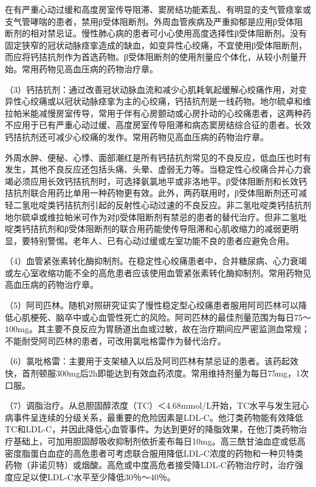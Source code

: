 在有严重心动过缓和高度房室传导阻滞、窦房结功能紊乱、有明显的支气管痉挛或支气管哮喘的患者，禁用β受体阻断剂。外周血管疾病及严重抑郁是应用β受体阻断剂的相对禁忌证。慢性肺心病的患者可小心使用高度选择性β受体阻断剂。没有固定狭窄的冠状动脉痉挛造成的缺血，如变异性心绞痛，不宜使用β受体阻断剂，而应将钙拮抗剂作为首选药物。β受体阻断剂的使用剂量应个体化，从较小剂量开始。常用药物见高血压病的药物治疗章。

（3）钙拮抗剂：通过改善冠状动脉血流和减少心肌耗氧起缓解心绞痛作用，对变异性心绞痛或以冠状动脉痉挛为主的心绞痛，钙拮抗剂是一线药物。地尔硫卓和维拉帕米能减慢房室传导，常用于伴有心房颤动或心房扑动的心绞痛患者，这两种药不应用于已有严重心动过缓、高度房室传导阻滞和病态窦房结综合征的患者。长效钙拮抗剂还可减少心绞痛的发作。常用药物见高血压病的药物治疗章。

外周水肿、便秘、心悸、面部潮红是所有钙拮抗剂常见的不良反应，低血压也时有发生，其他不良反应还包括头痛、头晕、虚弱无力等。当稳定性心绞痛合并心力衰竭必须应用长效钙拮抗剂时，可选择氨氯地平或非洛地平。β受体阻断剂和长效钙拮抗剂联合用药比单用一种药物更有效。此外，两药联用时，β受体阻断剂还可减轻二氢吡啶类钙拮抗剂引起的反射性心动过速的不良反应。非二氢吡啶类钙拮抗剂地尔硫卓或维拉帕米可作为对β受体阻断剂有禁忌的患者的替代治疗。但非二氢吡啶类钙拮抗剂和β受体阻断剂的联合用药能使传导阻滞和心肌收缩力的减弱更明显，要特别警惕。老年人、已有心动过缓或左室功能不良的患者应避免合用。

（4）血管紧张素转化酶抑制剂。在稳定性心绞痛患者中，合并糖尿病、心力衰竭或左心室收缩功能不全的高危患者应该使用血管紧张素转化酶抑制剂。常用药物见高血压病的药物治疗章。

（5）阿司匹林。随机对照研究证实了慢性稳定型心绞痛患者服用阿司匹林可以降低心肌梗死、脑卒中或心血管性死亡的风险。阿司匹林的最佳剂量范围为每日75～100mg。其主要不良反应为胃肠道出血或过敏，故在治疗期间应严密监测血常规；不能耐受阿司匹林的患者，可改用氯吡格雷作为替代治疗。

（6）氯吡格雷：主要用于支架植入以后及阿司匹林有禁忌证的患者。该药起效快，首剂顿服300mg后2h即能达到有效血药浓度。常用维持剂量为每日75mg，1次口服。

（7）调脂治疗。从总胆固醇浓度（TC）＜4.68mmol/L开始，TC水平与发生冠心病事件呈连续的分级关系，最重要的危险因素是LDL-C。他汀类药物能有效降低TC和LDL-C，并因此降低心血管事件。为达到更好的降脂效果，在他汀类药物治疗基础上，可加用胆固醇吸收抑制剂依折麦布每日10mg。高三酰甘油血症或低高密度脂蛋白血症的高危患者可考虑联合服用降低LDL-C浓度的药物和一种贝特类药物（非诺贝特）或烟酸。高危或中度高危者接受降LDL-C药物治疗时，治疗强度应足以使LDL-C水平至少降低30％～40％。

